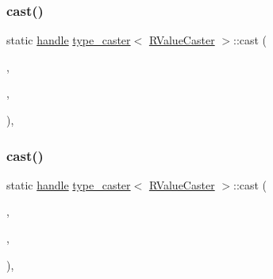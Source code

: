 \subsubsection{\texorpdfstring{cast()}{cast()}\hspace{0.1cm}{\footnotesize\ttfamily [1/2]}}
{\footnotesize\ttfamily static \mbox{\hyperlink{classhandle}{handle}} \mbox{\hyperlink{classtype__caster}{type\+\_\+caster}}$<$ \mbox{\hyperlink{struct_r_value_caster}{R\+Value\+Caster}} $>$\+::cast (\begin{DoxyParamCaption}\item[{\mbox{\hyperlink{struct_r_value_caster}{R\+Value\+Caster}} \&\&}]{,  }\item[{\mbox{\hyperlink{detail_2common_8h_adde72ab1fb0dd4b48a5232c349a53841}{return\+\_\+value\+\_\+policy}}}]{,  }\item[{\mbox{\hyperlink{classhandle}{handle}}}]{ }\end{DoxyParamCaption})\hspace{0.3cm}{\ttfamily [inline]}, {\ttfamily [static]}}

\mbox{\label{classtype__caster_3_01_r_value_caster_01_4_a5d5e153895d0a28031b94e037224b828}} 
\subsubsection{\texorpdfstring{cast()}{cast()}\hspace{0.1cm}{\footnotesize\ttfamily [2/2]}}
{\footnotesize\ttfamily static \mbox{\hyperlink{classhandle}{handle}} \mbox{\hyperlink{classtype__caster}{type\+\_\+caster}}$<$ \mbox{\hyperlink{struct_r_value_caster}{R\+Value\+Caster}} $>$\+::cast (\begin{DoxyParamCaption}\item[{const \mbox{\hyperlink{struct_r_value_caster}{R\+Value\+Caster}} \&}]{,  }\item[{\mbox{\hyperlink{detail_2common_8h_adde72ab1fb0dd4b48a5232c349a53841}{return\+\_\+value\+\_\+policy}}}]{,  }\item[{\mbox{\hyperlink{classhandle}{handle}}}]{ }\end{DoxyParamCaption})\hspace{0.3cm}{\ttfamily [inline]}, {\ttfamily [static]}}

